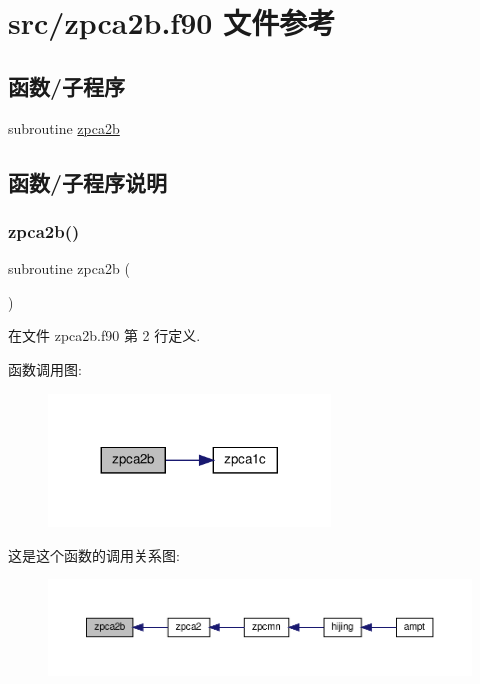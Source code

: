 \hypertarget{zpca2b_8f90}{}\section{src/zpca2b.f90 文件参考}
\label{zpca2b_8f90}
\subsection*{函数/子程序}
\begin{DoxyCompactItemize}
\item 
subroutine \mbox{\hyperlink{zpca2b_8f90_a7dc7aeb0b9461262907bceda0ea9634f}{zpca2b}}
\end{DoxyCompactItemize}


\subsection{函数/子程序说明}
\mbox{\label{zpca2b_8f90_a7dc7aeb0b9461262907bceda0ea9634f}} 
\subsubsection{\texorpdfstring{zpca2b()}{zpca2b()}}
{\footnotesize\ttfamily subroutine zpca2b (\begin{DoxyParamCaption}{ }\end{DoxyParamCaption})}



在文件 zpca2b.\+f90 第 2 行定义.

函数调用图\+:
\nopagebreak
\begin{figure}[H]
\begin{center}
\leavevmode
\includegraphics[width=212pt]{zpca2b_8f90_a7dc7aeb0b9461262907bceda0ea9634f_cgraph}
\end{center}
\end{figure}
这是这个函数的调用关系图\+:
\nopagebreak
\begin{figure}[H]
\begin{center}
\leavevmode
\includegraphics[width=350pt]{zpca2b_8f90_a7dc7aeb0b9461262907bceda0ea9634f_icgraph}
\end{center}
\end{figure}

